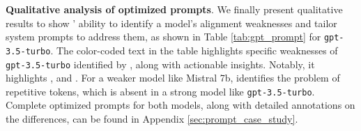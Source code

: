 
\noindent \textbf{Qualitative analysis of optimized prompts}. 
We finally present qualitative results to show \ours' ability to identify a model's alignment weaknesses and tailor system prompts to address them, as shown in Table \ref{tab:gpt_prompt} for \texttt{gpt-3.5-turbo}. The color-coded text in the table highlights specific weaknesses of \texttt{gpt-3.5-turbo} identified by \ours, along with actionable insights. Notably, it highlights ,  and . For a weaker model like Mistral 7b, \ours identifies the problem of repetitive tokens, which is absent in a strong model like \texttt{gpt-3.5-turbo}. Complete optimized prompts for both models, along with detailed annotations on the differences, can be found in Appendix \ref{sec:prompt_case_study}.  

